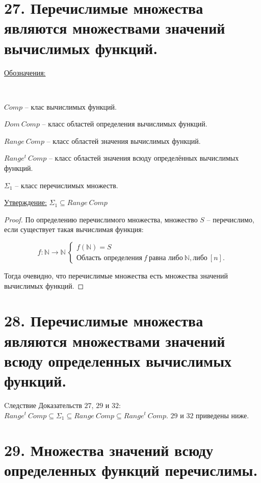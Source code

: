 \documentclass[a4paper, 12pt]{article}
\newcommand{\statement}{\underline{Утверждение:} }
\newcommand{\sign}{\underline{Обозначения:} }
\newcommand{\N}{\mathbb{N}}
\begin{document}
\section*{27. Перечислимые множества являются множествами значений вычислимых функций.}

\sign{
    \
    
    $Comp$ -- клас вычислимых функций.
    
    $Dom\ Comp$ -- класс областей определения вычислимых функций.
    
    $Range\ Comp$ -- класс областей значения вычислимых функций.
    
    $Range^t\ Comp$ -- класс областей значения всюду определённых вычислимых функций.
    
    $\Sigma_1$ -- класс перечислимых множеств.
}

\statement{$\Sigma_1 \subseteq Range\ Comp$}
        
        \begin{proof}
            По определению перечислимого множества, множество $S$ -- перечислимо, если существует такая вычислимая функция:
            
            \[
                f: \N \to \N\ 
                \begin{cases}
                    f(\N) = S \\
                    \text{Область определения} \ f \ \text{равна либо} \ \N, \text{либо} \ [n].
                \end{cases}
            \]
            
            Тогда очевидно, что перечислимые множества есть множества значений вычислимых функций.
        \end{proof}

\section*{28. Перечислимые множества являются множествами значений всюду определенных вычислимых функций.}

Cледствие Доказательств $27$, $29$ и $32$: $Range^t\ Comp \subseteq \Sigma_1 \subseteq Range\ Comp \subseteq Range^t\ Comp$. $29$ и $32$ приведены ниже.


\section*{29. Множества значений всюду определенных функций перечислимы.}
\end{document}
